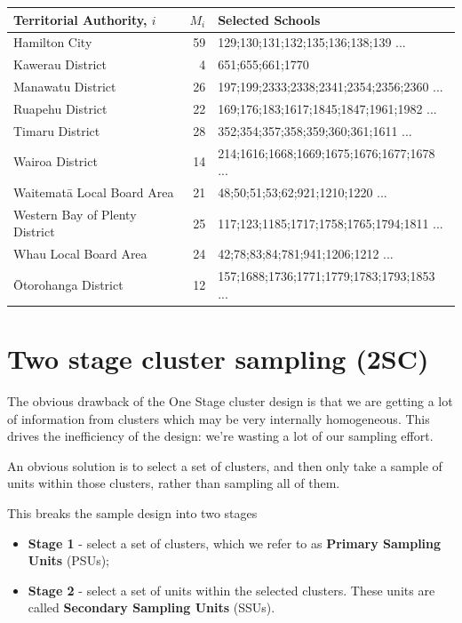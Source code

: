 \documentclass[
]{book}
\providecommand{\tightlist}{%
  \setlength{\itemsep}{0pt}\setlength{\parskip}{0pt}}
\begin{document}
\begin{table}
\centering
\begin{tabular}[t]{l|r|l}
\hline
Territorial Authority, $i$ & $M_i$ & Selected Schools\\
\hline
Hamilton City & 59 & 129;130;131;132;135;136;138;139 ...\\
\hline
Kawerau District & 4 & 651;655;661;1770\\
\hline
Manawatu District & 26 & 197;199;2333;2338;2341;2354;2356;2360 ...\\
\hline
Ruapehu District & 22 & 169;176;183;1617;1845;1847;1961;1982 ...\\
\hline
Timaru District & 28 & 352;354;357;358;359;360;361;1611 ...\\
\hline
Wairoa District & 14 & 214;1616;1668;1669;1675;1676;1677;1678 ...\\
\hline
Waitematā Local Board Area & 21 & 48;50;51;53;62;921;1210;1220 ...\\
\hline
Western Bay of Plenty District & 25 & 117;123;1185;1717;1758;1765;1794;1811 ...\\
\hline
Whau Local Board Area & 24 & 42;78;83;84;781;941;1206;1212 ...\\
\hline
Ōtorohanga District & 12 & 157;1688;1736;1771;1779;1783;1793;1853 ...\\
\hline
\end{tabular}
\end{table}

\section{Two stage cluster sampling (2SC)}\label{two-stage-cluster-sampling-2sc}

The obvious drawback of the One Stage cluster design is that we are getting
a lot of information from clusters which may be very internally homogeneous. This drives
the inefficiency of the design: we're wasting a lot of our sampling effort.

An obvious solution is to select a set of clusters, and then only take a sample of units
within those clusters, rather than sampling all of them.

This breaks the sample design into two stages

\begin{itemize}
\tightlist
\item
  \textbf{Stage 1} - select a set of clusters, which we refer to as \textbf{Primary Sampling Units} (PSUs);
\item
  \textbf{Stage 2} - select a set of units within the selected clusters. These units are called
  \textbf{Secondary Sampling Units} (SSUs).
\end{itemize}
\end{document}
